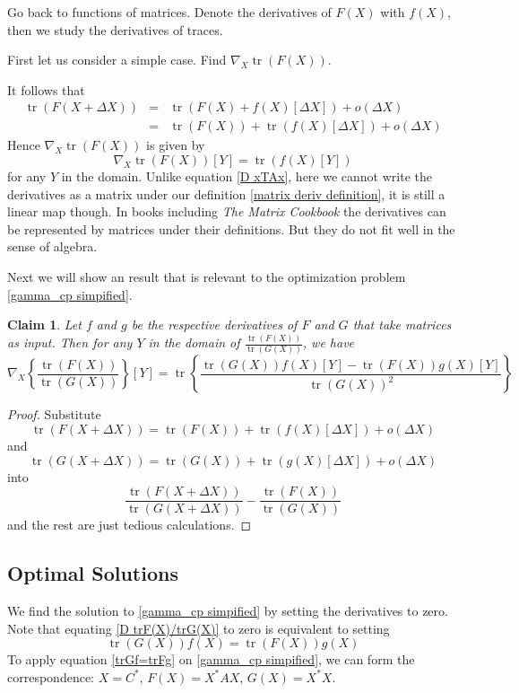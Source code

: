 \documentclass[12pt]{article}
\newtheorem{claim}{Claim}
\theoremstyle{definition}
\DeclareMathOperator{\tr}{tr} %
\begin{document}
Go back to functions of matrices. Denote the derivatives of $F(X)$ with $f(X)$, then we study the derivatives of traces.

First let us consider a simple case. Find $\nabla_X\tr(F(X))$.

It follows that
\begin{eqnarray*}
\tr(F(X+\Delta X))&=&\tr(F(X)+f(X)[\Delta X])+o(\Delta X)\\
&=&\tr(F(X))+\tr(f(X)[\Delta X])+o(\Delta X)
\end{eqnarray*}
Hence $\nabla_X\tr(F(X))$ is given by
\begin{equation}
	\nabla_X\tr(F(X))[Y]=\tr(f(X)[Y])\label{D trF(X)}
\end{equation}
for any $Y$ in the domain. Unlike equation \ref{D xTAx}, here we cannot write the derivatives as a matrix under our definition \ref{matrix deriv definition}, it is still a linear map though. In books including {\it The Matrix Cookbook} the derivatives can be represented by matrices under their definitions. But they do not fit well in the sense of algebra.

Next we will show an result that is relevant to the optimization problem \ref{gamma_cp simpified}.
\begin{claim}
	Let $f$ and $g$ be the respective derivatives of $F$ and $G$ that take matrices as input. Then for any $Y$ in the domain of $\frac{\tr(F(X))}{\tr(G(X))}$, we have
	\begin{equation}
		\nabla_X\left\{\frac{\tr(F(X))}{\tr(G(X))}\right\}[Y]=\tr\left\{\frac{\tr(G(X))f(X)[Y]-\tr(F(X))g(X)[Y]}{\tr(G(X))^2}\right\}\label{D trF(X)/trG(X)}
	\end{equation}
\end{claim}
\begin{proof}
	Substitute $$\tr(F(X+\Delta X))=\tr(F(X))+\tr(f(X)[\Delta X])+o(\Delta X)$$ and $$\tr(G(X+\Delta X))=\tr(G(X))+\tr(g(X)[\Delta X])+o(\Delta X)$$ into
	$$
	\frac{\tr(F(X+\Delta X))}{\tr(G(X+\Delta X))}-\frac{\tr(F(X))}{\tr(G(X))}
	$$
	and the rest are just tedious calculations.
\end{proof}

\subsection{Optimal Solutions}
We find the solution to \ref{gamma_cp simpified} by setting the derivatives to zero. Note that equating \ref{D trF(X)/trG(X)} to zero is equivalent to setting
\begin{equation}
	\tr(G(X))f(X)=\tr(F(X))g(X)\label{trGf=trFg}
\end{equation}
To apply equation \ref{trGf=trFg} on \ref{gamma_cp simpified}, we can form the correspondence: $X=C^*$, $F(X)=X^*AX$, $G(X)=X^*X$. 
\end{document}
